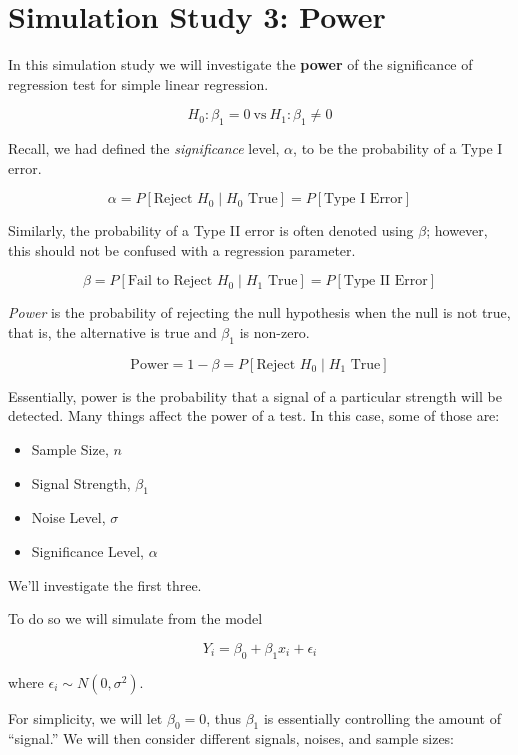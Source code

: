 \documentclass[
]{article}
\providecommand{\tightlist}{%
  \setlength{\itemsep}{0pt}\setlength{\parskip}{0pt}}
\begin{document}
\hypertarget{simulation-study-3-power}{%
\section{Simulation Study 3: Power}\label{simulation-study-3-power}}

In this simulation study we will investigate the \textbf{power} of the
significance of regression test for simple linear regression.

\[
H_0: \beta_{1} = 0 \ \text{vs} \ H_1: \beta_{1} \neq 0
\]

Recall, we had defined the \emph{significance} level, \(\alpha\), to be
the probability of a Type I error.

\[
\alpha = P[\text{Reject } H_0 \mid H_0 \text{ True}] = P[\text{Type I Error}]
\]

Similarly, the probability of a Type II error is often denoted using
\(\beta\); however, this should not be confused with a regression
parameter.

\[
\beta = P[\text{Fail to Reject } H_0 \mid H_1 \text{ True}] = P[\text{Type II Error}]
\]

\emph{Power} is the probability of rejecting the null hypothesis when
the null is not true, that is, the alternative is true and \(\beta_{1}\)
is non-zero.

\[
\text{Power} = 1 - \beta = P[\text{Reject } H_0 \mid H_1 \text{ True}]
\]

Essentially, power is the probability that a signal of a particular
strength will be detected. Many things affect the power of a test. In
this case, some of those are:

\begin{itemize}
\tightlist
\item
  Sample Size, \(n\)
\item
  Signal Strength, \(\beta_1\)
\item
  Noise Level, \(\sigma\)
\item
  Significance Level, \(\alpha\)
\end{itemize}

We'll investigate the first three.

To do so we will simulate from the model

\[
Y_i = \beta_0 + \beta_1 x_i + \epsilon_i
\]

where \(\epsilon_i \sim N(0, \sigma^2)\).

For simplicity, we will let \(\beta_0 = 0\), thus \(\beta_1\) is
essentially controlling the amount of ``signal.'' We will then consider
different signals, noises, and sample sizes:
\end{document}
